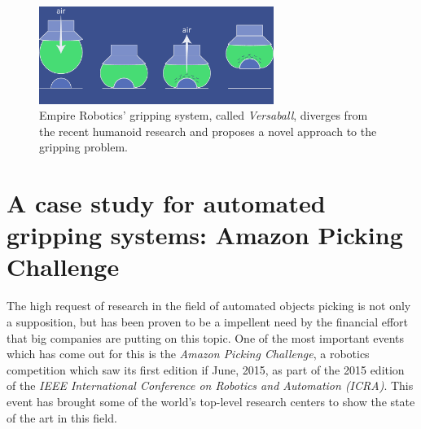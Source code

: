 \begin{figure}[htbp]
\centering
\includegraphics[width=3in]{./Graphics/versaball}
\caption{Empire Robotics' gripping system, called \emph{Versaball},
  diverges from the recent humanoid research and proposes a novel
  approach to the gripping problem.\label{fig:versaball}}
\end{figure}

\section{A case study for automated gripping systems: Amazon Picking
  Challenge} \label{sec:apc}
The high request of research in the field of automated objects picking
is not only a supposition, but has been proven to be a impellent need
by the financial effort that big companies are putting on this
topic. One of the most important events which has come out for this is
the \emph{Amazon Picking Challenge}, a robotics competition which saw
its first edition if June, 2015, as part of the 2015 edition of the \emph{IEEE
International Conference on Robotics and Automation (ICRA)}. This
event has brought some of the world's top-level research 
centers to show the state of the art in this field.

